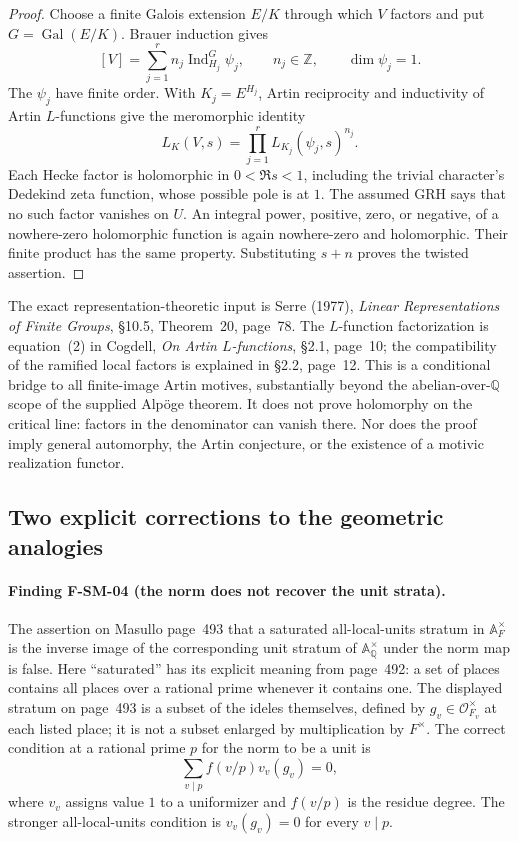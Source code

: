 \documentclass[11pt,a4paper]{article}
\theoremstyle{definition}\newtheorem{definition}[theorem]{Definition}
\theoremstyle{remark}\newtheorem{remark}[theorem]{Remark}
\begin{document}
\begin{proof}
Choose a finite Galois extension $E/K$ through which $V$ factors and put
$G=\operatorname{Gal}(E/K)$.  Brauer induction gives
\[
 [V]=\sum_{j=1}^r n_j\operatorname{Ind}_{H_j}^{G}\psi_j,
 \qquad n_j\in\mathbb Z,\qquad\dim\psi_j=1.
\]
The $\psi_j$ have finite order.  With $K_j=E^{H_j}$, Artin reciprocity
and inductivity of Artin $L$-functions give the meromorphic identity
\[
 L_K(V,s)=\prod_{j=1}^r L_{K_j}(\psi_j,s)^{n_j}.
\]
Each Hecke factor is holomorphic in $0<\Re s<1$, including the trivial
character's Dedekind zeta function, whose possible pole is at $1$.
The assumed GRH says that no such factor vanishes on $U$.  An integral
power, positive, zero, or negative, of a nowhere-zero holomorphic function
is again nowhere-zero and holomorphic.  Their finite product has the same
property.  Substituting $s+n$ proves the twisted assertion.
\end{proof}

The exact representation-theoretic input is Serre (1977),
\emph{Linear Representations of Finite Groups}, \S10.5, Theorem~20,
page~78.  The $L$-function factorization is equation~(2) in Cogdell,
\emph{On Artin $L$-functions}, \S2.1, page~10; the compatibility of the
ramified local factors is explained in \S2.2, page~12.  This is a conditional
bridge to all finite-image Artin motives, substantially beyond the
abelian-over-$\mathbb Q$ scope of the supplied Alp\"oge theorem.
It does not prove holomorphy on the critical line: factors in the denominator
can vanish there.  Nor does the proof imply general automorphy, the Artin
conjecture, or the existence of a motivic realization functor.

\subsection{Two explicit corrections to the geometric analogies}

\paragraph{Finding F-SM-04 (the norm does not recover the unit strata).}
The assertion on Masullo page~493 that a saturated all-local-units stratum
in $\mathbb A_F^\times$ is the inverse image of the corresponding unit
stratum of $\mathbb A_{\mathbb Q}^\times$ under the norm map is false.
Here ``saturated'' has its explicit meaning from page~492: a set of places
contains all places over a rational prime whenever it contains one.
The displayed stratum on page~493 is a subset of the ideles themselves,
defined by $g_v\in\mathcal O_{F_v}^{\times}$ at each listed place;
it is not a subset enlarged by multiplication by $F^{\times}$.
The correct condition at a rational prime $p$ for the norm to be a unit is
\[
 \sum_{v\mid p} f(v/p)v_v(g_v)=0,
\]
where $v_v$ assigns value $1$ to a uniformizer and $f(v/p)$ is the residue
degree.  The stronger all-local-units condition is $v_v(g_v)=0$ for
every $v\mid p$.
\end{document}
